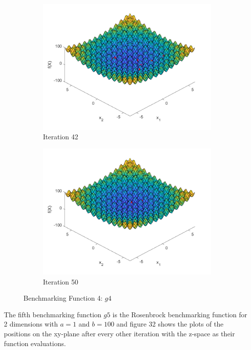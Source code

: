 \begin{figure}
\begin{subfigure}[b]{0.4\textwidth}
    \includegraphics[width=\textwidth]{img/smpl/rast2d/loa-iter-42}
    \caption{Iteration 42}
    \label{fig:s3-iter-6}
  \end{subfigure}
  \begin{subfigure}[b]{0.4\textwidth}
    \includegraphics[width=\textwidth]{img/smpl/rast2d/loa-iter-50}
    \caption{Iteration 50}
    \label{fig:s3-iter-7}
  \end{subfigure}
  \caption{Benchmarking Function 4: $g4$}
\end{figure}


\par The fifth benchmarking function $g5$ is the Rosenbrock benchmarking function for 2 dimensions with $a = 1$ and $b=100$ and figure 32 shows the plots of the positions on the xy-plane after every other iteration with the z-space as their function evaluations.

